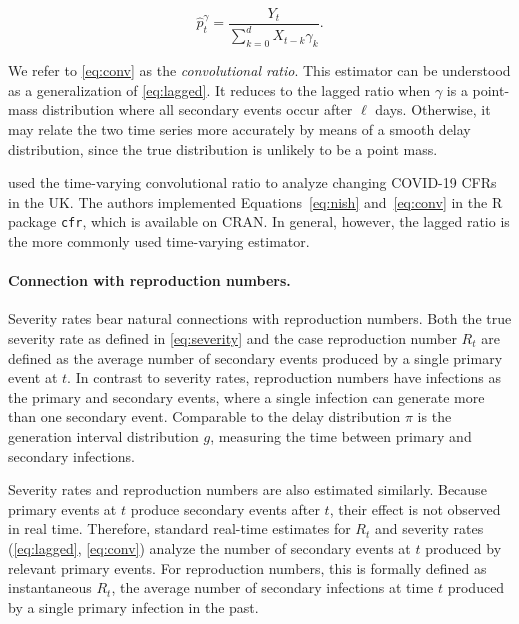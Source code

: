 \documentclass{article}
\renewcommand{\hat}{\widehat} %
\newcommand{\djmcomment}[1]{{\color{teal}[DJM: #1]}}
\newcommand{\jmgcomment}[1]{{\color{cyan}[JMG: #1]}}
\begin{document}
\begin{equation}\label{eq:conv}
    \hat{p}_t^{\gamma} = \frac{Y_t}{\sum_{k=0}^d X_{t-k}\gamma_k}.%
\end{equation}

We refer to \ref{eq:conv} as the \textit{convolutional ratio}. 
This estimator can be understood as a generalization of \eqref{eq:lagged}. 
It reduces to the lagged ratio when ${\gamma}$ is a point-mass distribution 
where all secondary events occur after $\ell$ days. 
Otherwise, it may relate the two time series more accurately by means of a smooth delay distribution, since the true distribution is unlikely to be a point mass. 

\citet{cfr_package} used the time-varying convolutional ratio to analyze changing COVID-19 CFRs in the UK. The authors implemented Equations~\eqref{eq:nish} and~\eqref{eq:conv} in the R package \texttt{cfr}, which is available on CRAN. In general, however, the lagged ratio is the more commonly used time-varying estimator.



\paragraph{Connection with reproduction numbers.} Severity rates bear natural connections with reproduction numbers. Both the true
severity rate as defined in \eqref{eq:severity} and the case
reproduction number $R_t$ are defined as the average number of secondary events
produced by a
single primary event at $t$. In contrast to severity rates, reproduction numbers
have infections as the primary and secondary events, where a single infection
can generate more than one secondary event. Comparable to the delay distribution
$\pi$ is the generation interval distribution $g$, measuring the time between primary and
secondary infections. 


Severity rates and reproduction numbers are also estimated similarly. Because primary events at $t$ produce secondary events after $t$, their effect is not observed in real time. Therefore, standard real-time estimates for $R_t$ and severity rates (\ref{eq:lagged}, \ref{eq:conv}) analyze the number of secondary events at $t$ produced by relevant primary events. 
For reproduction numbers, this is formally defined as instantaneous $R_t$, the average number of secondary infections at time $t$ produced by a single primary infection in the past. 
\end{document}
